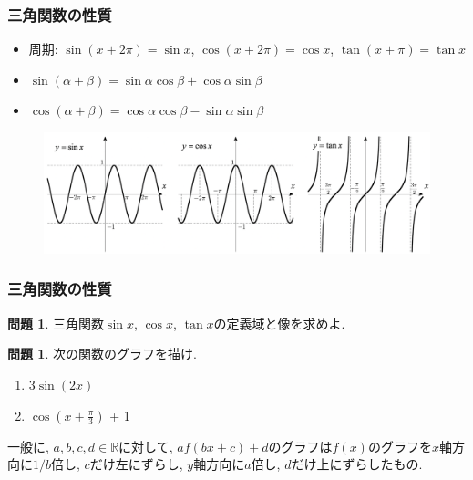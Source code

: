 \documentclass[dvipdfmx,cjk,10.2pt]{beamer}
\newcommand{\R}{\mathbb{R}}
\theoremstyle{definition}
\newtheorem{Prob}[Thm]{問題}
\begin{document}
\begin{frame}
\frametitle{三角関数の性質}

\begin{itemize}
\item 周期: $\sin (x + 2\pi) = \sin x$, $\cos (x + 2\pi) = \cos x$, $\tan (x +\pi) = \tan x$
\item $\sin(\alpha+\beta)=\sin \alpha \cos \beta + \cos \alpha \sin \beta$
\item $\cos(\alpha+\beta)=\cos \alpha \cos \beta - \sin \alpha \sin \beta$
\end{itemize}

\vspace{-2mm}

\begin{figure}[htbp]
 \begin{center} 
  \includegraphics[width=122mm]{trig.png}
 \end{center}
\end{figure}
\vspace{-4mm}

\end{frame}







\begin{frame}
\frametitle{三角関数の性質}

\begin{Prob}
三角関数$\sin x$, $\cos x$, $\tan x$の定義域と像を求めよ.  
\end{Prob}

\begin{Prob}
次の関数のグラフを描け. 
\begin{enumerate}
\item $3\sin(2x)$
\item $\cos(x+\frac{\pi}{3})$ + 1
\end{enumerate}
\end{Prob}

一般に, $a,b,c,d \in \R$に対して, $af(bx+c)+d$のグラフは$f(x)$のグラフを$x$軸方向に$1/b$倍し, $c$だけ左にずらし, $y$軸方向に$a$倍し, $d$だけ上にずらしたもの. 
\end{frame}
\end{document}
